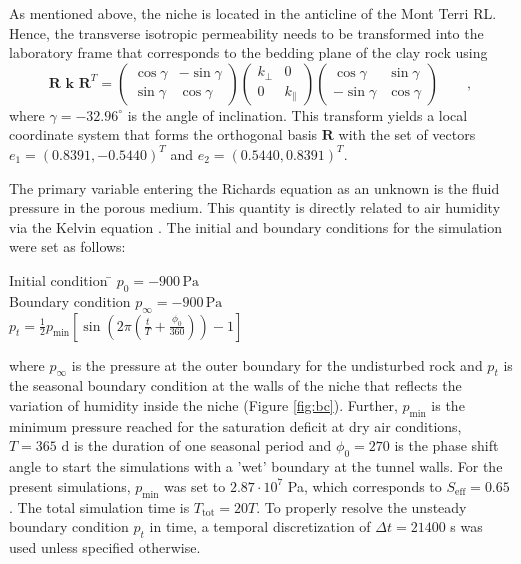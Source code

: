 As mentioned above, the niche is located in the anticline of the Mont Terri RL. Hence, the transverse isotropic permeability needs to be transformed into the laboratory frame that corresponds to the bedding plane of the clay rock using
\begin{equation}\label{eq:permeabilities}
\textbf{R k R}^T = \begin{pmatrix} \cos \gamma & -\sin \gamma \\ \sin \gamma & \cos \gamma \end{pmatrix}
\begin{pmatrix} k_\perp & 0 \\ 0 & k_\parallel \end{pmatrix}
\begin{pmatrix} \cos \gamma & \sin \gamma \\ -\sin \gamma & \cos \gamma \end{pmatrix} \qquad ,
\end{equation}
where $\gamma=-32.96^{\circ}$ is the angle of inclination. This transform yields a local coordinate system that forms the orthogonal basis $\textbf{R}$ with the set of vectors $e_1=(0.8391,-0.5440)^T$ and $e_2=(0.5440,0.8391)^T$.

The primary variable entering the Richards equation as an unknown is the fluid pressure in the porous medium. This quantity is directly related to air humidity via the Kelvin equation \cite{bond2013}. The initial and boundary conditions for the simulation were set as follows:
\begin{tabbing}
Initial condition \hspace{2cm} \=	$p_0 = -900 \, \text{Pa}$ \\
Boundary condition 	\>				$p_\infty = -900 \, \text{Pa}$ \\
					\>				$p_t = \frac{1}{2}p_\text{min}\left[\sin\left(2 \pi \left( \frac{t}{T}+ \frac{\phi_0}{360}\right)\right) - 1\right]$ \\
\end{tabbing}
where $p_\infty$ is the pressure at the outer boundary for the undisturbed rock and $p_t$ is the seasonal boundary condition at the walls of the niche that reflects the variation of humidity inside the niche (Figure \ref{fig:bc}). Further, $p_\text{min}$ is the minimum pressure reached for the saturation deficit at dry air conditions, $T=365\text{ d}$ is the duration of one seasonal period and $\phi_0=270$ is the phase shift angle to start the simulations with a 'wet'  boundary at the tunnel walls. For the present simulations, $p_\text{min}$ was set to $2.87 \cdot 10^7$ Pa, which corresponds to $S_\text{eff}=0.65$. The total simulation time is $T_\text{tot}= 20T$. To properly resolve the unsteady boundary condition $p_t$ in time, a temporal discretization of $\Delta t = 21400$ s was used unless specified otherwise. 

